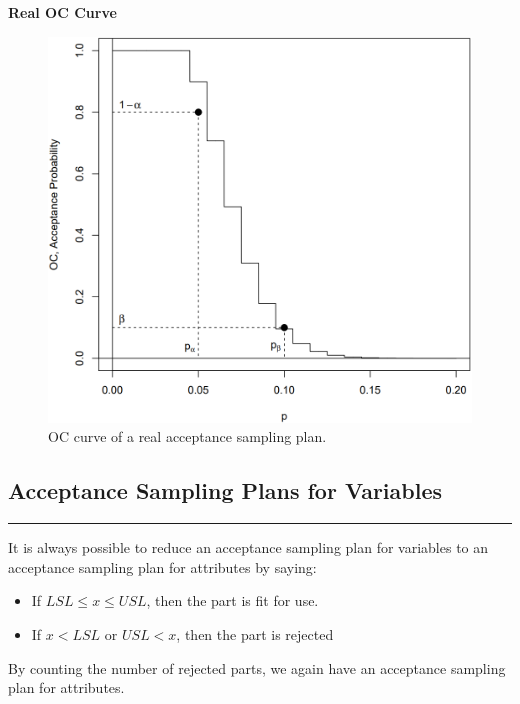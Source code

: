 \textbf{Real OC Curve}
\begin{figure}[H]
  \centering
  \includegraphics[width=0.8\linewidth]{Pics/5.1.4.png}
  \caption{OC curve of a real acceptance sampling plan.}
\end{figure}


\subsection{Acceptance Sampling Plans for Variables}
\noindent\rule[\linienAbstand]{\linewidth}{\linienDicke}
It is always possible to reduce an acceptance sampling plan for variables to an acceptance sampling plan for attributes by saying:\\

\begin{itemize}
  \item If $LSL \leq x \leq USL$, then the part is fit for use.
  \item If $x < LSL \text{ or } USL < x$, then the part is rejected
\end{itemize}

By counting the number of rejected parts, we again have an acceptance sampling plan for attributes.
